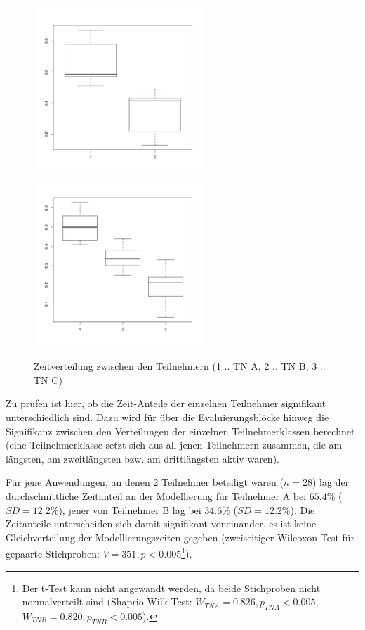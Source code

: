 \begin{figure}[htbp]
	\centering
		\includegraphics[height=2.5in]{img/Evaluierung/timeDist2TN.png}
		\includegraphics[height=2.5in]{img/Evaluierung/timeDist3TN.png}
	\caption[Zeitverteilung zwischen den Teilnehmern]{Zeitverteilung zwischen den Teilnehmern (1 .. TN A, 2 .. TN B, 3 .. TN C)}
	\label{fig:img_Evaluierung_timeDist}
\end{figure}

Zu prüfen ist hier, ob die Zeit-Anteile der einzelnen Teilnehmer signifikant unterschiedlich sind. Dazu wird für über die Evaluierungsblöcke hinweg die Signifikanz zwischen den Verteilungen der einzelnen Teilnehmerklassen berechnet (eine Teilnehmerklasse setzt sich aus all jenen Teilnehmern zusammen, die am längsten, am zweitlängsten bzw. am drittlängsten aktiv waren).

Für jene Anwendungen, an denen 2 Teilnehmer beteiligt waren ($n=28$) lag der durchschnittliche Zeitanteil an der Modellierung für Teilnehmer A bei $65.4\%$ ($SD=12.2\%$), jener von Teilnehmer B lag bei $34.6\%$ ($SD=12.2\%$). Die Zeitanteile unterscheiden sich damit signifikant voneinander, es ist keine Gleichverteilung der Modellierungszeiten gegeben (zweiseitiger Wilcoxon-Test für gepaarte Stichproben: $V=351, p<0.005$\footnote{Der t-Test kann nicht angewandt werden, da beide Stichproben nicht normalverteilt sind (Shaprio-Wilk-Test: $W_{TN A}=0.826, p_{TN A}<0.005$, $W_{TN B}=0.820, p_{TN B}<0.005$).}).


